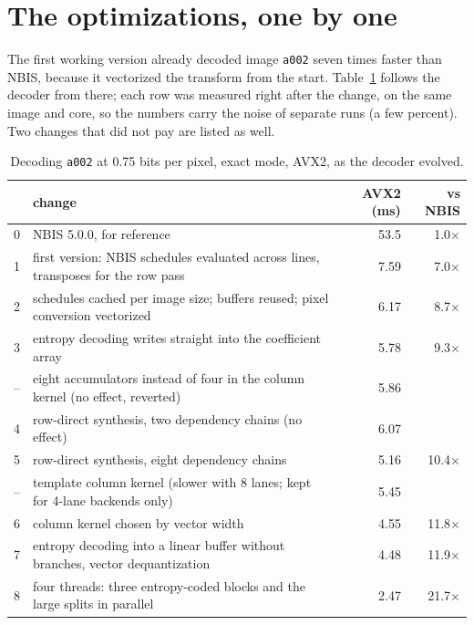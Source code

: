 \section{The optimizations, one by one}
\label{sec:optimizations}

The first working version already decoded image \texttt{a002} seven times faster than NBIS,
because it vectorized the transform from the start. Table~\ref{tab:history} follows the decoder
from there; each row was measured right after the change, on the same image and core, so the
numbers carry the noise of separate runs (a few percent). Two changes that did not pay are
listed as well.

\begin{table}[ht]
  \centering\small
  \begin{tabular}{@{}rp{9.6cm}rr@{}}
    \toprule
    & change & AVX2 (ms) & vs NBIS \\
    \midrule
    0 & NBIS 5.0.0, for reference & 53.5 & 1.0$\times$ \\
    1 & first version: NBIS schedules evaluated across lines, transposes for the row pass & 7.59 & 7.0$\times$ \\
    2 & schedules cached per image size; buffers reused; pixel conversion vectorized & 6.17 & 8.7$\times$ \\
    3 & entropy decoding writes straight into the coefficient array & 5.78 & 9.3$\times$ \\
    -- & eight accumulators instead of four in the column kernel (no effect, reverted) & 5.86 & \\
    4 & row-direct synthesis, two dependency chains (no effect) & 6.07 & \\
    5 & row-direct synthesis, eight dependency chains & 5.16 & 10.4$\times$ \\
    -- & template column kernel (slower with 8 lanes; kept for 4-lane backends only) & 5.45 & \\
    6 & column kernel chosen by vector width & 4.55 & 11.8$\times$ \\
    7 & entropy decoding into a linear buffer without branches, vector dequantization & 4.48 & 11.9$\times$ \\
    8 & four threads: three entropy-coded blocks and the large splits in parallel & 2.47 & 21.7$\times$ \\
    \bottomrule
  \end{tabular}
  \caption{Decoding \texttt{a002} at 0.75 bits per pixel, exact mode, AVX2, as the decoder evolved.}
  \label{tab:history}
\end{table}

